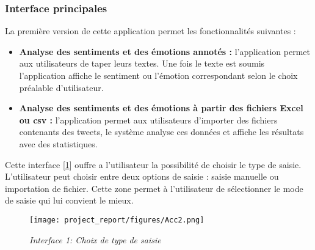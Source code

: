 \subsubsection{Interface principales}
La première version de cette application permet les fonctionnalités suivantes :
\begin{itemize}
    \item \textbf{Analyse des sentiments et des émotions annotés :} l’application permet aux utilisateurs de taper leurs textes. Une fois le texte est soumis l’application affiche le sentiment ou l’émotion correspondant selon le choix préalable d’utilisateur.
    \item \textbf{Analyse des sentiments et des émotions à partir des fichiers Excel ou csv :} l’application permet aux utilisateurs d’importer des fichiers contenants des tweets, le système analyse ces données et affiche les résultats avec des statistiques.
\end{itemize}
Cette interface [\ref{fig:acc}] ouffre a l'utilisateur la possibilité de choisir le type de saisie. L'utilisateur peut choisir entre deux options de saisie : saisie manuelle ou importation de fichier. Cette zone permet à l'utilisateur de sélectionner le mode de saisie qui lui convient le mieux.

\begin{figure}[h]
    \centering
    \texttt{[image: project\_report/figures/Acc2.png]}
    \caption{\textit{Interface 1: Choix de type de saisie}}
    \label{fig:acc}
\end{figure}



